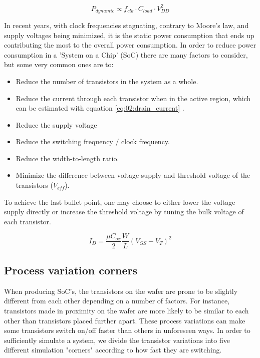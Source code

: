 \begin{equation}
    P_{dynamic} \propto f_{clk} \cdot C_{load} \cdot V_{DD}^2
    \label{eq:02:dynamic_power}
\end{equation}

In recent years, with clock frequencies stagnating, contrary to Moore's law, and supply voltages being minimized, it is the static power consumption that ends up contributing the most to the overall power consumption. In order to reduce power consumption in a 'System on a Chip' (SoC) there are many factors to consider, but some very common ones are to: 
\begin{itemize}
    \item Reduce the number of transistors in the system as a whole.
    \item Reduce the current through each transistor when in the active region, which can be estimated with equation \ref{eq:02:drain_current} \cite{analog2011}. 
    \item Reduce the supply voltage
    \item Reduce the switching frequency / clock frequency.
    \item Reduce the width-to-length ratio.
    \item Minimize the difference between voltage supply and threshold voltage of the transistors ($V_{eff}$).
\end{itemize}

To achieve the last bullet point, one may choose to either lower the voltage supply directly or increase the threshold voltage by tuning the bulk voltage of each transistor. 

\begin{equation}
    I_D = \frac{\mu C_{ox}}{2} \frac{W}{L} (V_{GS} - V_T)^2 
    \label{eq:02:drain_current}
\end{equation}


\subsection{Process variation corners}
When producing SoC's, the transistors on the wafer are prone to be slightly different from each other depending on a number of factors. For instance, transistors made in proximity on the wafer are more likely to be similar to each other than transistors placed further apart. These process variations can make some transistors switch on/off faster than others in unforeseen ways. In order to sufficiently simulate a system, we divide the transistor variations into five different simulation "corners" according to how fast they are switching.

